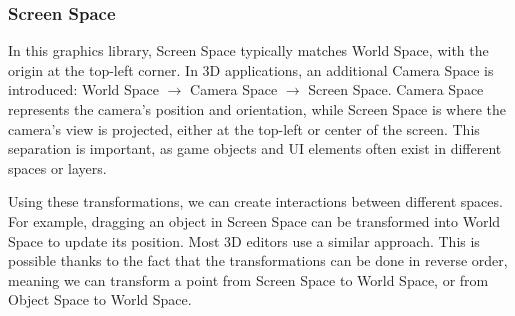\vspace{1cm}

\subsubsection{Screen Space}
\label{sec:screen-space}

In this graphics library, Screen Space typically matches World Space, with the origin at the top-left corner. In 3D applications, an additional Camera Space is introduced: World Space $\rightarrow$ Camera Space $\rightarrow$ Screen Space. Camera Space represents the camera's position and orientation, while Screen Space is where the camera's view is projected, either at the top-left or center of the screen. This separation is important, as game objects and UI elements often exist in different spaces or layers.

\begin{Note}
    Using these transformations, we can create interactions between different spaces. For example, dragging an object in Screen Space can be transformed into World Space to update its position. Most 3D editors use a similar approach. This is possible thanks to the fact that the transformations can be done in reverse order, meaning we can transform a point from Screen Space to World Space, or from Object Space to World Space.
\end{Note}

\pagebreak
